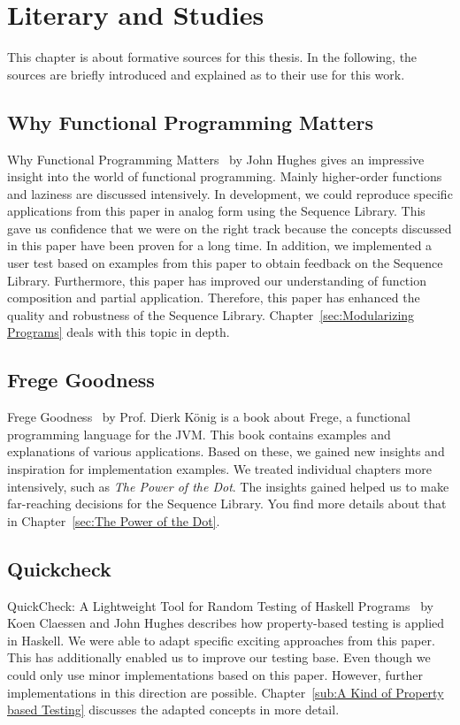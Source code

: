 \section{Literary and Studies}
\label{sec:Literary and Studies}
This chapter is about formative sources for this thesis. In the following, the
sources are briefly introduced and explained as to their use for this work.

\subsection{Why Functional Programming Matters}
\label{sub:Functional Programming Matters}
Why Functional Programming Matters~\cite{hughes_why_1989} by John Hughes gives an 
impressive insight into the world of functional
programming. Mainly higher-order functions and laziness are discussed
intensively. In development, we could reproduce specific applications from this
paper in analog form using the Sequence Library. This gave us confidence that
we were on the right track because the concepts discussed in this paper have
been proven for a long time. In addition, we implemented a user test based on
examples from this paper to obtain feedback on the Sequence Library.
\newline
Furthermore, this paper has improved our understanding of function composition
and partial application. Therefore, this paper has enhanced the quality and
robustness of the Sequence Library. Chapter~\ref{sec:Modularizing Programs} 
deals with this topic in depth.

\subsection{Frege Goodness}
\label{sub:Frege Goodness}
Frege Goodness~\cite{frege_goodness} by Prof. Dierk König is a book about Frege, a functional
programming language for the JVM. This book contains examples and
explanations of various applications. Based on these, we gained new insights and inspiration for
implementation examples. We treated individual chapters more intensively, such
as \textit{The Power of the Dot}. The insights gained helped us to make far-reaching
decisions for the Sequence Library. You find more details about that in
Chapter~\ref{sec:The Power of the Dot}.

\subsection{Quickcheck}
\label{sub:Quickcheck}
QuickCheck: A Lightweight Tool for Random Testing
of Haskell Programs~\cite{quickcheck_hughes} by Koen Claessen and John Hughes describes how
property-based testing is applied in Haskell. We were able to adapt specific
exciting approaches from this paper. This has additionally enabled us to
improve our testing base. Even though we could only use minor implementations
based on this paper. However, further implementations in this direction are
possible. Chapter~\ref{sub:A Kind of Property based Testing} discusses the
adapted concepts in more detail. 

